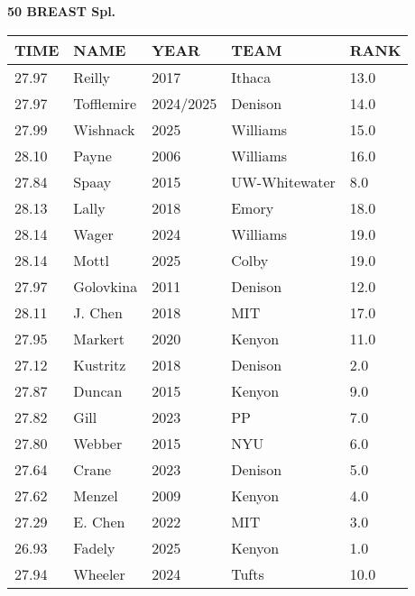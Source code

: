 \begin{center}
\begin{minipage}[t]{0.7\textwidth}
\centering
\textbf{50 BREAST Spl.}\\[0.05cm]
\begin{tabular}{@{}p{1.8cm}p{2.8cm}p{1.2cm}p{1.4cm}p{0.8cm}@{}}
\hline
\textbf{TIME} & \textbf{NAME} & \textbf{YEAR} & \textbf{TEAM} & \textbf{RANK} \\
\hline
27.97 & Reilly & 2017 & Ithaca & 13.0 \\
27.97 & Tofflemire & 2024/2025 & Denison & 14.0 \\
27.99 & Wishnack & 2025 & Williams & 15.0 \\
28.10 & Payne & 2006 & Williams & 16.0 \\
27.84 & Spaay & 2015 & UW-Whitewater & 8.0 \\
28.13 & Lally & 2018 & Emory & 18.0 \\
28.14 & Wager & 2024 & Williams & 19.0 \\
28.14 & Mottl & 2025 & Colby & 19.0 \\
27.97 & Golovkina & 2011 & Denison & 12.0 \\
28.11 & J. Chen & 2018 & MIT & 17.0 \\
27.95 & Markert & 2020 & Kenyon & 11.0 \\
27.12 & Kustritz & 2018 & Denison & 2.0 \\
27.87 & Duncan & 2015 & Kenyon & 9.0 \\
27.82 & Gill & 2023 & PP & 7.0 \\
27.80 & Webber & 2015 & NYU & 6.0 \\
27.64 & Crane & 2023 & Denison & 5.0 \\
27.62 & Menzel & 2009 & Kenyon & 4.0 \\
27.29 & E. Chen & 2022 & MIT & 3.0 \\
26.93 & Fadely & 2025 & Kenyon & 1.0 \\
27.94 & Wheeler & 2024 & Tufts & 10.0 \\
\hline
\end{tabular}
\end{minipage}
\end{center}

\vspace{0.4cm}

